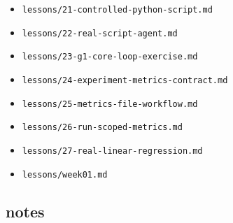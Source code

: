 \documentclass[UTF8,zihao=-4,fontset=fandol]{ctexart}
\begin{document}
\begin{itemize}
\item \nolinkurl{lessons/21-controlled-python-script.md}
\item \nolinkurl{lessons/22-real-script-agent.md}
\item \nolinkurl{lessons/23-g1-core-loop-exercise.md}
\item \nolinkurl{lessons/24-experiment-metrics-contract.md}
\item \nolinkurl{lessons/25-metrics-file-workflow.md}
\item \nolinkurl{lessons/26-run-scoped-metrics.md}
\item \nolinkurl{lessons/27-real-linear-regression.md}
\item \nolinkurl{lessons/week01.md}
\end{itemize}

\subsection{notes}
\end{document}

